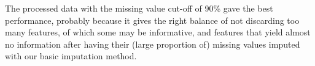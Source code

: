 \documentclass{article}\usepackage[]{graphicx}\usepackage[]{color}
\begin{document}
                                                                                                                                                                                                                                                                                                                                                                                                                                                                                                                                                                                                The processed data with the missing value cut-off of 90\% gave the best performance, probably because it gives the right balance of not discarding too many features, of which some may be informative, and features that yield almost no information after having their (large proportion of) missing values imputed with our basic imputation method.
                                                                                                                                                                                                                                                                                                                                                                                                                                                                                                                                                                                                
\end{document}
